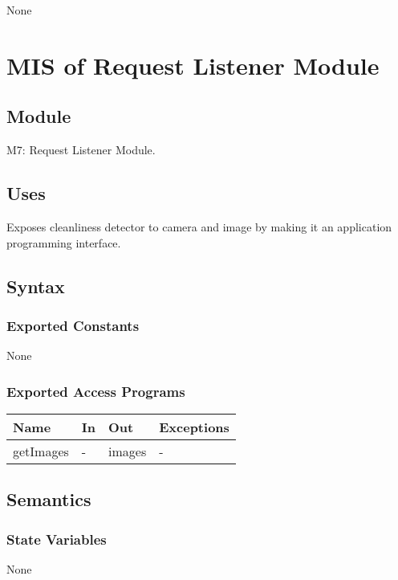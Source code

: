 \documentclass[12pt, titlepage]{article}
\begin{document}
None

\newpage


\section{MIS of Request Listener Module} \label{Module} 

\subsection{Module}

M7: Request Listener Module.

\subsection{Uses}
Exposes cleanliness detector to camera and image by making it an application programming interface.

\subsection{Syntax}

\subsubsection{Exported Constants}
None

\subsubsection{Exported Access Programs}

\begin{center}
\begin{tabular}{p{4cm} p{4cm} p{4cm} p{3.5cm}}
\hline
\textbf{Name} & \textbf{In} & \textbf{Out} & \textbf{Exceptions} \\
\hline
getImages & - & images & - \\
\hline
\end{tabular}
\end{center}

\subsection{Semantics}

\subsubsection{State Variables}
None
\end{document}
